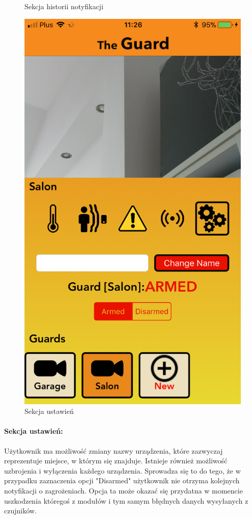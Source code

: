 \begin{figure}[h]
\begin{minipage}{.4\linewidth}
    \caption{Sekcja historii notyfikacji}
    \label{img1}
\end{minipage}
\hspace{.05\linewidth}
\begin{minipage}{.4\linewidth}
    \includegraphics[width=\linewidth]{settings.png}
    \caption{Sekcja ustawień}
    \label{img2}
\end{minipage}
\end{figure} 
\paragraph{Sekcja ustawień:}
Użytkownik ma możliwość zmiany nazwy urządzenia, które zazwyczaj reprezentuje miejsce, w którym się znajduje. Istnieje również możliwość uzbrojenia i wyłączenia każdego urządzenia. Sprowadza się to do tego, że w przypadku zaznaczenia opcji "Disarmed" użytkownik nie otrzyma kolejnych notyfikacji o zagrożeniach. Opcja ta może okazać się przydatna w momencie uszkodzenia któregoś z modułów i tym samym błędnych danych wysyłanych z czujników.
